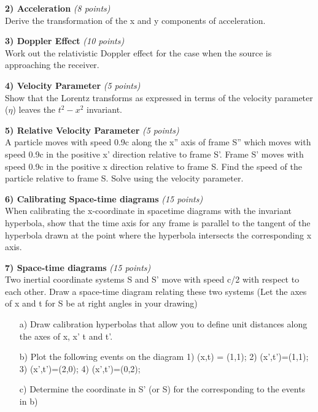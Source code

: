 {\large
\textbf{2) Acceleration } \hfill \textit{(8 points)}\\
Derive the transformation of the x and y components of acceleration.

\vspace*{0.25in}


\textbf{3) Doppler Effect } \hfill \textit{(10 points)}\\
Work out the relativistic Doppler effect for the case when the source is approaching the receiver.

\vspace*{0.25in}

\textbf{4) Velocity Parameter  } \hfill \textit{(5 points)}\\
Show that the Lorentz transforms as expressed in terms of the velocity parameter ($\eta$) leaves the $t^2-x^2$ invariant.

\vspace*{0.25in}


\textbf{5) Relative Velocity Parameter  } \hfill \textit{(5 points)}\\
A particle moves with speed 0.9c along the x'' axis of frame S'' which moves with speed 0.9c in the positive x' direction relative to frame S'.
Frame S' moves with speed 0.9c in the positive x direction relative to frame S. Find the speed of the particle relative to frame S.
Solve using the velocity parameter.

\vspace*{0.25in}

\textbf{6) Calibrating Space-time diagrams  } \hfill \textit{(15 points)}\\
When calibrating the x-coordinate in spacetime diagrams with the invariant hyperbola, show that the time axis for any frame is parallel to the tangent of the hyperbola drawn at the point where the hyperbola intersects the corresponding x axis.

\vspace*{0.25in}

\clearpage

\textbf{7) Space-time diagrams  } \hfill \textit{(15 points)}\\
Two inertial coordinate systems S and S' move with speed c/2 with respect to each other.
Draw a  space-time diagram relating these two systems (Let the axes of x and t for S be at right angles in your drawing)

\begin{itemize}
\item[a)] Draw calibration hyperbolas that allow you to define unit distances along the axes of x, x' t and t'.
\item[b)] Plot the following events on the diagram 1) (x,t) = (1,1); 2) (x',t')=(1,1); 3) (x',t')=(2,0); 4) (x',t')=(0,2);
\item[c)] Determine the coordinate in S' (or S) for the corresponding to the events in b)
\end{itemize}

}
